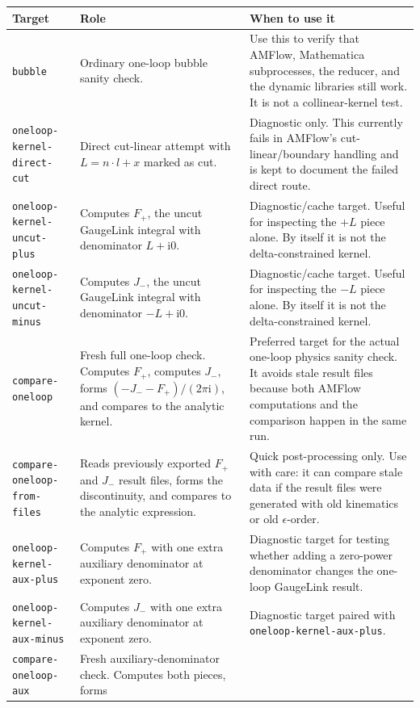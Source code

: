 \documentclass[11pt]{article}
\newcommand{\ii}{\mathrm{i}}
\newcommand{\eps}{\epsilon}
\newcommand{\WL}[1]{\texttt{#1}}
\begin{document}
\begin{center}
\begin{tabular}{p{}p{}p{}}
\hline
\textbf{Target} & \textbf{Role} & \textbf{When to use it} \\
\hline
\WL{bubble}
& Ordinary one-loop bubble sanity check.
& Use this to verify that AMFlow, Mathematica subprocesses, the reducer, and
  the dynamic libraries still work. It is not a collinear-kernel test. \\
\WL{oneloop-kernel-direct-cut}
& Direct cut-linear attempt with \(L=n\cdot l+x\) marked as cut.
& Diagnostic only. This currently fails in AMFlow's cut-linear/boundary
  handling and is kept to document the failed direct route. \\
\WL{oneloop-kernel-uncut-plus}
& Computes \(F_+\), the uncut GaugeLink integral with denominator
  \(L+\ii0\).
& Diagnostic/cache target. Useful for inspecting the \(+L\) piece alone. By
  itself it is not the delta-constrained kernel. \\
\WL{oneloop-kernel-uncut-minus}
& Computes \(J_-\), the uncut GaugeLink integral with denominator
  \(-L+\ii0\).
& Diagnostic/cache target. Useful for inspecting the \(-L\) piece alone. By
  itself it is not the delta-constrained kernel. \\
\WL{compare-oneloop}
& Fresh full one-loop check. Computes \(F_+\), computes \(J_-\), forms
  \((-J_--F_+)/(2\pi\ii)\), and compares to the analytic kernel.
& Preferred target for the actual one-loop physics sanity check. It avoids
  stale result files because both AMFlow computations and the comparison happen
  in the same run. \\
\WL{compare-oneloop-from-files}
& Reads previously exported \(F_+\) and \(J_-\) result files, forms the
  discontinuity, and compares to the analytic expression.
& Quick post-processing only. Use with care: it can compare stale data if the
  result files were generated with old kinematics or old \(\eps\)-order. \\
\WL{oneloop-kernel-aux-plus}
& Computes \(F_+\) with one extra auxiliary denominator at exponent zero.
& Diagnostic target for testing whether adding a zero-power denominator changes
  the one-loop GaugeLink result. \\
\WL{oneloop-kernel-aux-minus}
& Computes \(J_-\) with one extra auxiliary denominator at exponent zero.
& Diagnostic target paired with \WL{oneloop-kernel-aux-plus}. \\
\WL{compare-oneloop-aux}
& Fresh auxiliary-denominator check. Computes both pieces, forms

\end{tabular}
\end{center}
\end{document}
